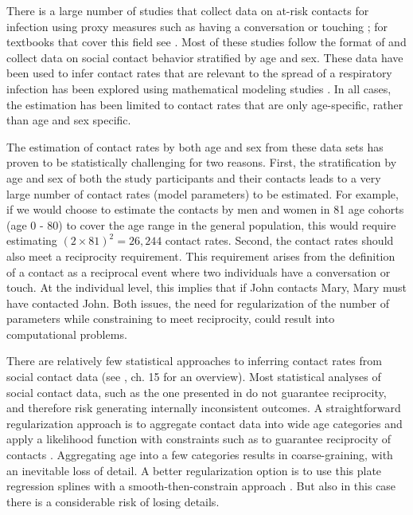 \documentclass[aoas,preprint]{imsart}
\numberwithin{equation}{section}
\begin{document}
There is a large number of studies that collect data on at-risk contacts for infection using proxy measures such as having a conversation or touching \citep[e.g.]{edmunds_who_1997, wallinga_using_2006, mossong_social_2008, salathe_high-resolution_2010, read_close_2012, danon_social_2013, kucharski_contribution_2014, kwok_social_2014, eames_six_2015, dodd_age-_2016}; for textbooks that cover this field see \citet{vynnycky_introduction_2010, hens_modeling_2012}. Most of these studies follow the format of \citet{mossong_social_2008} and collect data on social contact behavior stratified by age and sex. These data have been used to infer contact rates that are relevant to the spread of a respiratory infection has been explored using mathematical modeling studies \citep[e.g.]{medlock_optimizing_2009, miller_incidence_2010, rohani_contact_2010, keeling_targeting_2011}. In all cases, the estimation has been limited to contact rates that are only age-specific, rather than age and sex specific. 

The estimation of contact rates by both age and sex from these data sets has proven to be statistically challenging for two reasons. First, the stratification by age and sex of both the study participants and their contacts leads to a very large number of contact rates (model parameters) to be estimated. For example, if we would choose to estimate the contacts by men and women in 81 age cohorts (age 0 - 80) to cover the age range in the general population, this would require estimating $(2 \times 81)^2 = 26,244$ contact rates. Second, the contact rates should also meet a reciprocity requirement. This requirement arises from the definition of a contact as a reciprocal event where two individuals have a conversation or touch. At the individual level, this implies that if John contacts Mary, Mary must have contacted John. Both issues, the need for regularization of the number of parameters while constraining to meet reciprocity, could result into computational problems.

There are relatively few statistical approaches to inferring contact rates from social contact data (see \citet{hens_modeling_2012}, ch. 15 for an overview). Most statistical analyses of social contact data, such as the one presented in \citet{mossong_social_2008} do not guarantee reciprocity, and therefore risk generating internally inconsistent outcomes. A straightforward regularization approach is to aggregate contact data into wide age categories and apply a likelihood function with constraints such as to guarantee reciprocity of contacts \citep{wallinga_using_2006}. Aggregating age into a few categories results in coarse-graining, with an inevitable loss of detail. A better regularization option is to use this plate regression splines with a smooth-then-constrain approach \citep{hens_mining_2009, goeyvaerts_estimating_2010}. But also in this case there is a considerable risk of losing details.
\end{document}
